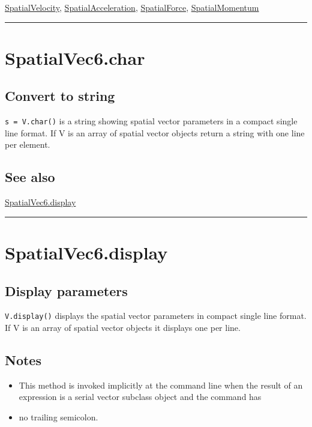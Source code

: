\hyperlink{SpatialVelocity}{\color{blue} SpatialVelocity}, \hyperlink{SpatialAcceleration}{\color{blue} SpatialAcceleration}, \hyperlink{SpatialForce}{\color{blue} SpatialForce}, \hyperlink{SpatialMomentum}{\color{blue} SpatialMomentum}

\vspace{1.5ex}\hrule

\hypertarget{SpatialVec6.char}{\section*{SpatialVec6.char}}
\subsection*{Convert to string}


\texttt{s = V.char()} is a string showing spatial vector parameters in a
compact single line format.
If V is an array of spatial vector objects return a string with one
line per element.


\subsection*{See also}


\hyperlink{SpatialVec6.display}{\color{blue} SpatialVec6.display}

\vspace{1.5ex}\hrule

\hypertarget{SpatialVec6.display}{\section*{SpatialVec6.display}}
\subsection*{Display parameters}


\texttt{V.display()} displays the spatial vector parameters in compact single line format.
If V is an array of spatial vector objects it displays one per line.


\subsection*{Notes}
\begin{itemize}
  \item This method is invoked implicitly at the command line when the result     of an expression is a serial vector subclass object and the command has
  \item no trailing semicolon.
\end{itemize}


